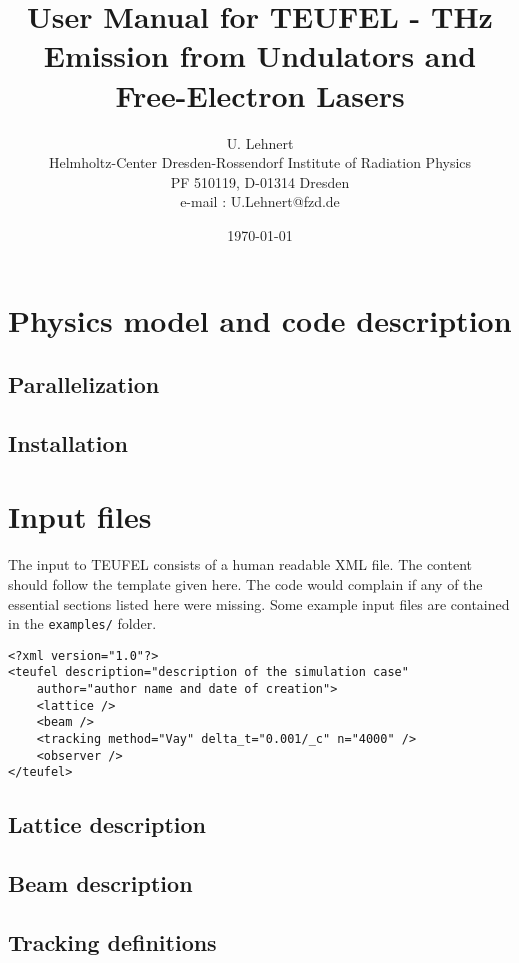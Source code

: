 \documentclass[11pt]{article}
\title{User Manual for TEUFEL - THz Emission from Undulators and Free-Electron Lasers}
\author{U. Lehnert\\
\footnotesize{Helmholtz-Center Dresden-Rossendorf}
\footnotesize{Institute of Radiation Physics}\\
\footnotesize{PF 510119, D-01314 Dresden}\\
\footnotesize{e-mail : U.Lehnert@fzd.de}}
\date{\today\\[1cm]}
\begin{document}
\maketitle
\tableofcontents

\section{Physics model and code description}

\subsection{Parallelization}

\subsection{Installation}

\section{Input files}

The input to TEUFEL consists of a human readable XML file. The content should follow
the template given here. The code would complain if any of the essential sections
listed here were missing. Some example input files are contained in the \verb|examples/| folder.

\begin{lstlisting}
<?xml version="1.0"?>
<teufel description="description of the simulation case"
    author="author name and date of creation">
    <lattice />
    <beam />
    <tracking method="Vay" delta_t="0.001/_c" n="4000" />
    <observer />
</teufel>
\end{lstlisting}

\subsection{Lattice description}


\subsection{Beam description}


\subsection{Tracking definitions}
\end{document}
